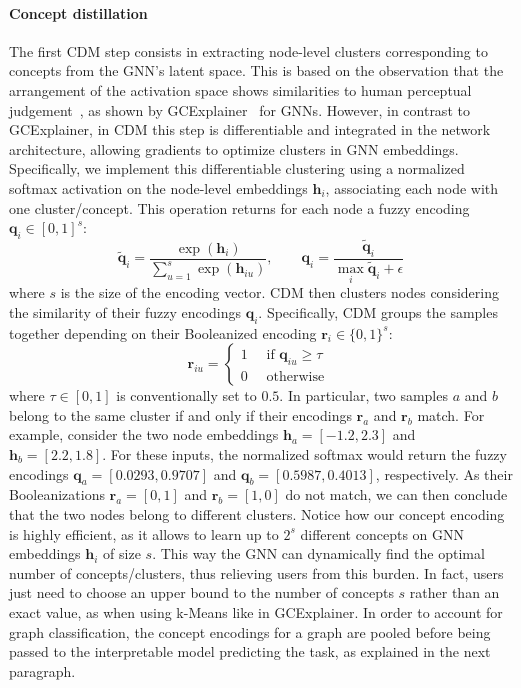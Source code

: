 \paragraph{Concept distillation}
The first CDM step consists in extracting node-level clusters corresponding to concepts from the GNN's latent space. This is based on the observation that the arrangement of the activation space shows similarities to human perceptual judgement~\citep{zhang2018unreasonable}, as shown by GCExplainer~\citep{magister2021gcexplainer} for GNNs. However, in contrast to GCExplainer, in CDM this step is differentiable and integrated in the network architecture, allowing gradients to optimize clusters in GNN embeddings. Specifically, we implement this differentiable clustering using a normalized softmax activation on the node-level embeddings $\mathbf{h}_i$, associating each node with one cluster/concept. This operation returns for each node a fuzzy encoding $\mathbf{q}_i \in [0,1]^s$:
\begin{equation} \label{eq:diffGCExp}
    \tilde{\mathbf{q}}_i = \frac{\exp({\mathbf{h}_i})}{\sum_{u=1}^s \exp(\mathbf{h}_{iu})}, \qquad \mathbf{q}_i = \frac{\tilde{\mathbf{q}}_i}{\max_i \tilde{\mathbf{q}}_i + \epsilon}
\end{equation}
where $s$ is the size of the encoding vector. CDM then clusters nodes considering the similarity of their fuzzy encodings $\mathbf{q}_i$. Specifically, CDM groups the samples together depending on their Booleanized encoding $\mathbf{r}_i \in \{0,1\}^s$:
\begin{equation}
    \mathbf{r}_{iu} = 
    \begin{cases}
    1 \quad \text{ if } \mathbf{q}_{iu} \geq \tau\\
    0 \quad \text{ otherwise }
    \end{cases}
\end{equation}
where $\tau \in [0,1]$ is conventionally set to $0.5$.
In particular, two samples $a$ and $b$ belong to the same cluster if and only if their encodings $\mathbf{r}_a$ and $\mathbf{r}_b$ match.  For example, consider the two node embeddings $\mathbf{h}_a = [-1.2, 2.3]$ and $\mathbf{h}_b = [2.2, 1.8]$. For these inputs, the normalized softmax would return the fuzzy encodings $\mathbf{q}_a = [0.0293, 0.9707]$ and $\mathbf{q}_b = [0.5987, 0.4013]$, respectively. As their Booleanizations $\mathbf{r}_a = [0, 1]$ and $\mathbf{r}_b = [1, 0]$ do not match, we can then conclude that the two nodes belong to different clusters. Notice how our concept encoding is highly efficient, as it allows to learn up to $2^s$ different concepts on GNN embeddings $\mathbf{h}_i$ of size $s$. This way the GNN can dynamically find the optimal number of concepts/clusters, thus relieving users from this burden. In fact, users just need to choose an upper bound to the number of concepts $s$ rather than an exact value, as when using k-Means like in GCExplainer. In order to account for graph classification, the concept encodings for a graph are pooled before being passed to the interpretable model predicting the task, as explained in the next paragraph.

